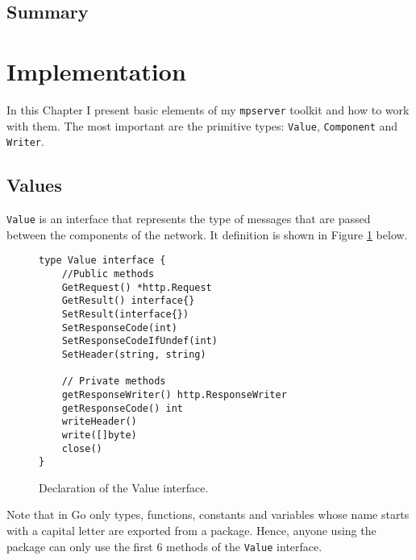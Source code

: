 \documentclass[12pt,a4paper]{article}
\begin{document}
\subsection{Summary}


\newpage
\section{Implementation}
\label{sec:impl}
In this Chapter I present basic elements of my \texttt{mpserver} toolkit
and how to work with them. The most important are the primitive types:
\texttt{Value}, \texttt{Component} and \texttt{Writer}.

\subsection{Values}
\texttt{Value} is an interface that represents the type of messages that are
passed between the components of the network. It definition is shown
in Figure \ref{fig:Value} below.

\begin{figure}[h]
\centering
\begin{lstlisting}
type Value interface {
    //Public methods
    GetRequest() *http.Request
    GetResult() interface{}
    SetResult(interface{})
    SetResponseCode(int)
    SetResponseCodeIfUndef(int)
    SetHeader(string, string)

    // Private methods
    getResponseWriter() http.ResponseWriter
    getResponseCode() int
    writeHeader()
    write([]byte)
    close()
}
\end{lstlisting}
\caption[scale=1.0]{Declaration of the Value interface.}
\label{fig:Value}
\end{figure}

Note that in Go only types, functions, constants and variables whose name
starts with a capital letter are exported from a package. Hence, anyone
using the package can only use the first 6 methods of the \texttt{Value}
interface.
\end{document}
